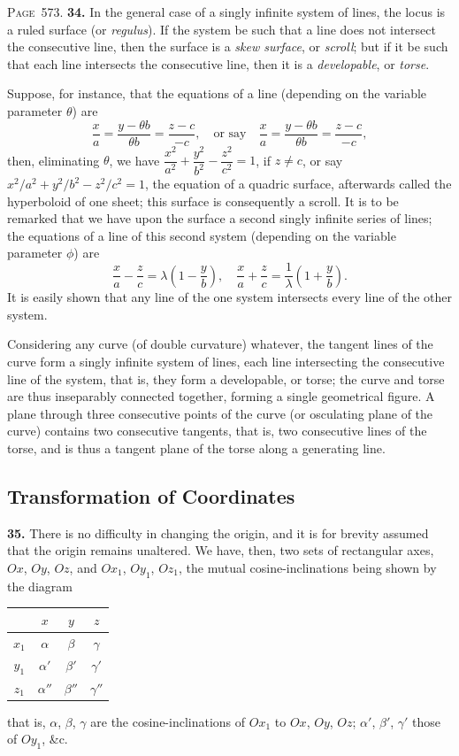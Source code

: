 \documentclass[11pt,a4paper]{book}
\begin{document}
\newpage
\noindent\textsc{Page~573.} \textbf{34.} In the general case of a singly infinite system of lines, the locus is a ruled surface (or \textit{regulus}). If the system be such that a line does not intersect the consecutive line, then the surface is a \textit{skew surface}, or \textit{scroll}; but if it be such that each line intersects the consecutive line, then it is a \textit{developable}, or \textit{torse}.

Suppose, for instance, that the equations of a line (depending on the variable parameter $\theta$) are
\[
\frac{x}{a}=\frac{y-\theta b}{\theta b}=\frac{z-c}{-c},\quad\text{or say}\quad
\frac{x}{a}=\frac{y-\theta b}{\theta b}=\frac{z-c}{-c},
\]
then, eliminating $\theta$, we have $\dfrac{x^2}{a^2}+\dfrac{y^2}{b^2}-\dfrac{z^2}{c^2}=1$, if $z\neq c$, or say $x^2/a^2+y^2/b^2-z^2/c^2=1$, the equation of a quadric surface, afterwards called the hyperboloid of one sheet; this surface is consequently a scroll. It is to be remarked that we have upon the surface a second singly infinite series of lines; the equations of a line of this second system (depending on the variable parameter $\phi$) are
\[
\frac{x}{a}-\frac{z}{c}=\lambda\left(1-\frac{y}{b}\right),\quad
\frac{x}{a}+\frac{z}{c}=\frac{1}{\lambda}\left(1+\frac{y}{b}\right).
\]
It is easily shown that any line of the one system intersects every line of the other system.

Considering any curve (of double curvature) whatever, the tangent lines of the curve form a singly infinite system of lines, each line intersecting the consecutive line of the system, that is, they form a developable, or torse; the curve and torse are thus inseparably connected together, forming a single geometrical figure. A plane through three consecutive points of the curve (or osculating plane of the curve) contains two consecutive tangents, that is, two consecutive lines of the torse, and is thus a tangent plane of the torse along a generating line.

\subsection*{Transformation of Coordinates}

\textbf{35.} There is no difficulty in changing the origin, and it is for brevity assumed that the origin remains unaltered. We have, then, two sets of rectangular axes, $Ox$, $Oy$, $Oz$, and $Ox_1$, $Oy_1$, $Oz_1$, the mutual cosine-inclinations being shown by the diagram
\begin{center}
\begin{tabular}{c|ccc}
& $x$ & $y$ & $z$ \\
\hline
$x_1$ & $\alpha$ & $\beta$ & $\gamma$ \\
$y_1$ & $\alpha'$ & $\beta'$ & $\gamma'$ \\
$z_1$ & $\alpha''$ & $\beta''$ & $\gamma''$ \\
\end{tabular}
\end{center}
that is, $\alpha$, $\beta$, $\gamma$ are the cosine-inclinations of $Ox_1$ to $Ox$, $Oy$, $Oz$; $\alpha'$, $\beta'$, $\gamma'$ those of $Oy_1$, \&c.
\end{document}
